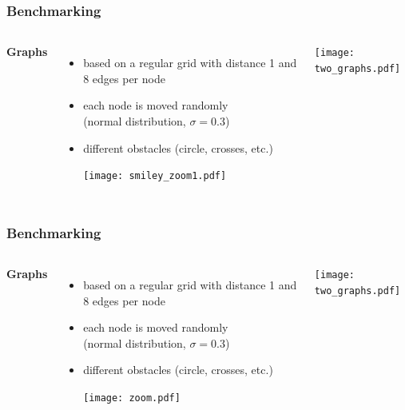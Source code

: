 \documentclass{beamer}
\begin{document}
\begin{frame}
\frametitle{Benchmarking}
\begin{columns}[c] %
\textbf{Graphs}
\begin{itemize}
\item based on a regular grid with distance 1 and 8 edges per node
\item each node  is moved randomly\\(normal distribution, $\sigma = 0.3$)
\item different obstacles (circle, crosses, etc.)
\vspace{10pt}
\begin{center}
	\texttt{[image: smiley\_zoom1.pdf]}
\end{center}
\end{itemize}

\begin{center}
	\texttt{[image: two\_graphs.pdf]}
\end{center}
\end{columns}
\end{frame}

\begin{frame}
\frametitle{Benchmarking}
\begin{columns}[c] %
\textbf{Graphs}
\begin{itemize}
\item based on a regular grid with distance 1 and 8 edges per node
\item each node  is moved randomly\\(normal distribution, $\sigma = 0.3$)
\item different obstacles (circle, crosses, etc.)
\vspace{10pt}
\begin{center}
	\texttt{[image: zoom.pdf]}
\end{center}
\end{itemize}

\begin{center}
	\texttt{[image: two\_graphs.pdf]}
\end{center}
\end{columns}
\end{frame}
\end{document}
